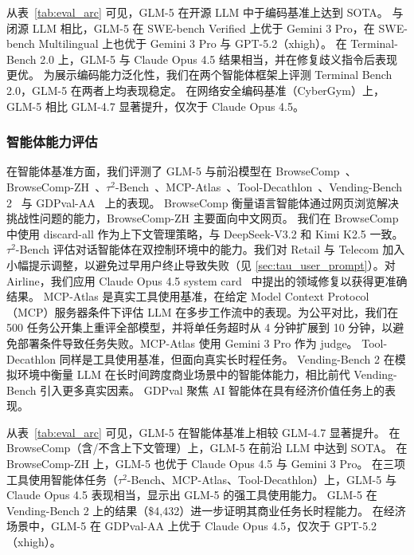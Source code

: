 从表~\ref{tab:eval_arc} 可见，GLM-5 在开源 LLM 中于编码基准上达到 SOTA。
与闭源 LLM 相比，GLM-5 在 SWE-bench Verified 上优于 Gemini 3 Pro，在 SWE-bench Multilingual 上也优于 Gemini 3 Pro 与 GPT-5.2（xhigh）。
在 Terminal-Bench 2.0 上，GLM-5 与 Claude Opus 4.5 结果相当，并在修复歧义指令后表现更优。
为展示编码能力泛化性，我们在两个智能体框架上评测 Terminal Bench 2.0，GLM-5 在两者上均表现稳定。
在网络安全编码基准（CyberGym）上，GLM-5 相比 GLM-4.7 显著提升，仅次于 Claude Opus 4.5。


\subsubsection{智能体能力评估}


在智能体基准方面，我们评测了 GLM-5 与前沿模型在 BrowseComp~\cite{wei2025browsecomp}、BrowseComp-ZH~\cite{zhou2025browsecompzh}、$\tau^2$-Bench~\cite{barres2025tau2}、MCP-Atlas~\cite{bandi2026mcp}、Tool-Decathlon~\cite{li2025tool}、Vending-Bench 2~\cite{backlund2025vending} 与 GDPval-AA~\cite{patwardhan2025gdpval} 上的表现。
BrowseComp 衡量语言智能体通过网页浏览解决挑战性问题的能力，BrowseComp-ZH 主要面向中文网页。
我们在 BrowseComp 中使用 discard-all 作为上下文管理策略，与 DeepSeek-V3.2 和 Kimi K2.5 一致。
$\tau^2$-Bench 评估对话智能体在双控制环境中的能力。我们对 Retail 与 Telecom 加入小幅提示调整，以避免过早用户终止导致失败（见 \ref{sec:tau_user_prompt}）。对 Airline，我们应用 Claude Opus 4.5 system card~\cite{opus4.5} 中提出的领域修复以获得更准确结果。
MCP-Atlas 是真实工具使用基准，在给定 Model Context Protocol（MCP）服务器条件下评估 LLM 在多步工作流中的表现。为公平对比，我们在 500 任务公开集上重评全部模型，并将单任务超时从 4 分钟扩展到 10 分钟，以避免部署条件导致任务失败。MCP-Atlas 使用 Gemini 3 Pro 作为 judge。
Tool-Decathlon 同样是工具使用基准，但面向真实长时程任务。
Vending-Bench 2 在模拟环境中衡量 LLM 在长时间跨度商业场景中的智能体能力，相比前代 Vending-Bench 引入更多真实因素。
GDPval 聚焦 AI 智能体在具有经济价值任务上的表现。

从表~\ref{tab:eval_arc} 可见，GLM-5 在智能体基准上相较 GLM-4.7 显著提升。
在 BrowseComp（含/不含上下文管理）上，GLM-5 在前沿 LLM 中达到 SOTA。
在 BrowseComp-ZH 上，GLM-5 也优于 Claude Opus 4.5 与 Gemini 3 Pro。
在三项工具使用智能体任务（$\tau^2$-Bench、MCP-Atlas、Tool-Decathlon）上，GLM-5 与 Claude Opus 4.5 表现相当，显示出 GLM-5 的强工具使用能力。
GLM-5 在 Vending-Bench 2 上的结果（\$4,432）进一步证明其商业任务长时程能力。
在经济场景中，GLM-5 在 GDPval-AA 上优于 Claude Opus 4.5，仅次于 GPT-5.2（xhigh）。


